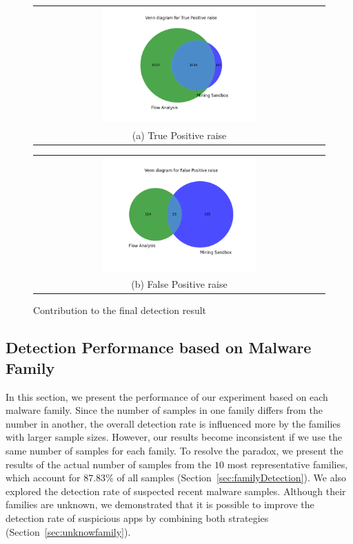 \begin{figure}[t!]
  \centering
  \begin{tabular}{@{}c@{}}
    \includegraphics[width=0.54\textwidth]{image/vennTP.png} \\[\abovecaptionskip]
    \small (a) True Positive raise
  \end{tabular}

  \begin{tabular}{@{}c@{}}
    \includegraphics[width=0.54\textwidth]{image/vennFP.png} \\[\abovecaptionskip]
    \small (b) False Positive raise
  \end{tabular}

  \caption{Contribution to the final detection result}\label{fig:venn}
\end{figure}


\subsection{Detection Performance based on Malware Family}\label{sec:family}

In this section, we present the performance of our experiment based on each malware family. Since the number of samples in one family differs from the number in another, the overall detection rate is influenced more by the families with larger sample sizes. However, our results become inconsistent if we use the same number of samples for each family. To resolve the paradox, we present the results of the actual number of samples from the $10$ most representative families, which account for $87.83\%$ of all samples (Section~\ref{sec:familyDetection}). We also explored the detection rate of suspected recent malware samples. Although their families are unknown, we demonstrated that it is possible to improve the detection rate of suspicious apps by combining both strategies (Section~\ref{sec:unknowfamily}).


